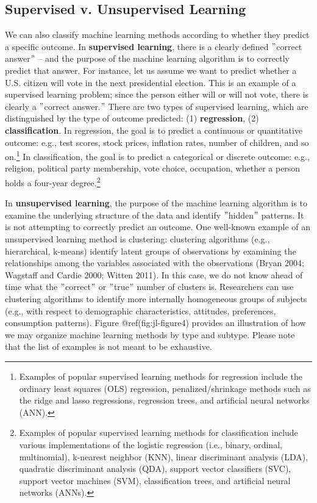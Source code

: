 \documentclass{book}
\begin{document}
\hypertarget{supervised-v.-unsupervised-learning}{%
\subsection{Supervised v. Unsupervised
Learning}\label{supervised-v.-unsupervised-learning}}

We can also classify machine learning methods according to whether they
predict a specific outcome. In \textbf{supervised learning}, there is a
clearly defined \("\)correct answer\("\) -- and the purpose of the machine
learning algorithm is to correctly predict that answer. For instance, let us
assume we want to predict whether a U.S. citizen will vote in the next
presidential election. This is an example of a supervised learning problem;
since the person either will or will not vote, there is clearly a \("\)correct
answer.\("\) There are two types of supervised learning, which are
distinguished by the type of outcome predicted: (1) \textbf{regression}, (2)
\textbf{classification}. In regression, the goal is to predict a continuous or
quantitative outcome: e.g., test scores, stock prices, inflation rates, number
of children, and so on.\footnote{Examples of popular supervised learning
  methods for regression include the ordinary least squares (OLS) regression,
  penalized/shrinkage methods such as the ridge and lasso regressions,
  regression trees, and artificial neural networks (ANN).} In classification,
the goal is to predict a categorical or discrete outcome: e.g., religion,
political party membership, vote choice, occupation, whether a person holds a
four-year degree.\footnote{Examples of popular supervised learning methods for
  classification include various implementations of the logistic regression
  (i.e., binary, ordinal, multinomial), k-nearest neighbor (KNN), linear
  discriminant analysis (LDA), quadratic discriminant analysis (QDA), support
  vector classifiers (SVC), support vector machines (SVM), classification
  trees, and artificial neural networks (ANNs).}

In \textbf{unsupervised learning}, the purpose of the machine learning
algorithm is to examine the underlying structure of the data and identify
\("\)hidden\("\) patterns. It is not attempting to correctly predict an
outcome. One well-known example of an unsupervised learning method is
clustering: clustering algorithms (e.g., hierarchical, k-means) identify
latent groups of observations by examining the relationships among the
variables associated with the observations (Bryan 2004; Wagstaff and Cardie
2000; Witten 2011). In this case, we do not know ahead of time what the
\("\)correct\("\) or \("\)true\("\) number of clusters is. Researchers can use
clustering algorithms to identify more internally homogeneous groups of
subjects (e.g., with respect to demographic characteristics, attitudes,
preferences, consumption patterns). Figure @ref(fig:jl-figure4) provides an
illustration of how we may organize machine learning methods by type and
subtype. Please note that the list of examples is not meant to be exhaustive.
\end{document}

